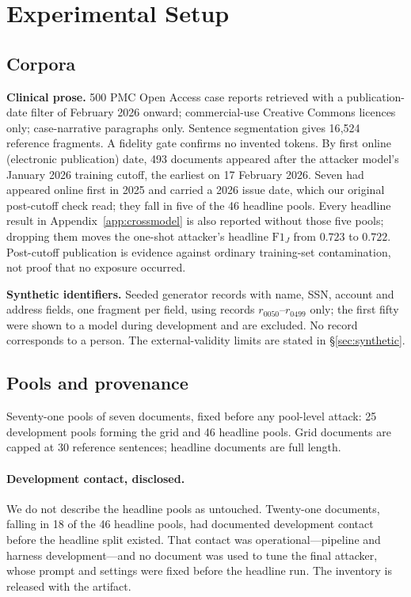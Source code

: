 \documentclass[sigconf,review]{acmart}
\newcommand{\FJ}{\ensuremath{\mathrm{F1}_{J}}}
\begin{document}
\section{Experimental Setup}
\label{sec:setup}

\subsection{Corpora}
\label{sec:corpora}
\textbf{Clinical prose.} 500 PMC Open Access case reports retrieved with a
publication-date filter of February 2026 onward; commercial-use Creative
Commons licences only; case-narrative paragraphs only. Sentence segmentation
gives 16{,}524 reference fragments. A fidelity gate confirms no invented
tokens. By first online (electronic publication) date, 493 documents appeared
after the attacker model's January 2026 training cutoff, the earliest on
17 February 2026. Seven had appeared online first in 2025 and carried a 2026
issue date, which our original post-cutoff check read; they fall in five of the
46 headline pools. Every headline result in Appendix~\ref{app:crossmodel} is
also reported without those five pools; dropping them moves the one-shot
attacker's headline \FJ{} from $0.723$ to $0.722$.
Post-cutoff publication is evidence against ordinary training-set
contamination, not proof that no exposure occurred.

\textbf{Synthetic identifiers.} Seeded generator records with name, SSN,
account and address fields, one fragment per field, using records
$r_{0050}$--$r_{0499}$ only; the first fifty were shown to a model during
development and are excluded. No record corresponds to a person. The
external-validity limits are stated in \S\ref{sec:synthetic}.

\subsection{Pools and provenance}
\label{sec:pools}

Seventy-one pools of seven documents, fixed before any pool-level attack:
25 development pools forming the grid and 46 headline pools. Grid documents are
capped at 30 reference sentences; headline documents are full length.

\paragraph{Development contact, disclosed.} We do not describe the headline
pools as untouched. Twenty-one documents, falling in 18 of the 46 headline
pools, had documented development contact before the headline split existed.
That contact was operational---pipeline and harness development---and no
document was used to tune the final attacker, whose prompt and settings were
fixed before the headline run. The inventory is released with the artifact.
\end{document}
